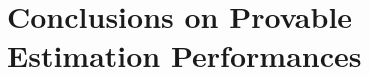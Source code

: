 \section{Conclusions on Provable Estimation Performances}\label{sec:priv_estimation:conclusion}




